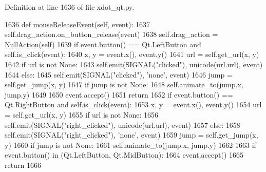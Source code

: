 Definition at line 1636 of file xdot\+\_\+qt.\+py.


\begin{DoxyCode}
1636     \textcolor{keyword}{def }\hyperlink{namespacesmacc__viewer_1_1xdot_1_1xdot__qt_a75da0a63e3a1afbe18b1ffae4efa71c4}{mouseReleaseEvent}(self, event):
1637         self.drag\_action.on\_button\_release(event)
1638         self.drag\_action = \hyperlink{classsmacc__viewer_1_1xdot_1_1xdot__qt_1_1NullAction}{NullAction}(self)
1639         \textcolor{keywordflow}{if} event.button() == Qt.LeftButton \textcolor{keywordflow}{and} self.is\_click(event):
1640             x, y = event.x(), event.y()
1641             url = self.get\_url(x, y)
1642             \textcolor{keywordflow}{if} url \textcolor{keywordflow}{is} \textcolor{keywordflow}{not} \textcolor{keywordtype}{None}:
1643                 self.emit(SIGNAL(\textcolor{stringliteral}{"clicked"}), unicode(url.url), event)
1644             \textcolor{keywordflow}{else}:
1645                 self.emit(SIGNAL(\textcolor{stringliteral}{"clicked"}), \textcolor{stringliteral}{'none'}, event)
1646                 jump = self.get\_jump(x, y)
1647                 \textcolor{keywordflow}{if} jump \textcolor{keywordflow}{is} \textcolor{keywordflow}{not} \textcolor{keywordtype}{None}:
1648                     self.animate\_to(jump.x, jump.y)
1649 
1650             event.accept()
1651             \textcolor{keywordflow}{return}
1652         \textcolor{keywordflow}{if} event.button() == Qt.RightButton \textcolor{keywordflow}{and} self.is\_click(event):
1653             x, y = event.x(), event.y()
1654             url = self.get\_url(x, y)
1655             \textcolor{keywordflow}{if} url \textcolor{keywordflow}{is} \textcolor{keywordflow}{not} \textcolor{keywordtype}{None}:
1656                 self.emit(SIGNAL(\textcolor{stringliteral}{"right\_clicked"}), unicode(url.url), event)
1657             \textcolor{keywordflow}{else}:
1658                 self.emit(SIGNAL(\textcolor{stringliteral}{"right\_clicked"}), \textcolor{stringliteral}{'none'}, event)
1659                 jump = self.get\_jump(x, y)
1660                 \textcolor{keywordflow}{if} jump \textcolor{keywordflow}{is} \textcolor{keywordflow}{not} \textcolor{keywordtype}{None}:
1661                     self.animate\_to(jump.x, jump.y)
1662 
1663         \textcolor{keywordflow}{if} event.button() \textcolor{keywordflow}{in} (Qt.LeftButton, Qt.MidButton):
1664             event.accept()
1665         \textcolor{keywordflow}{return}
1666 
\end{DoxyCode}

